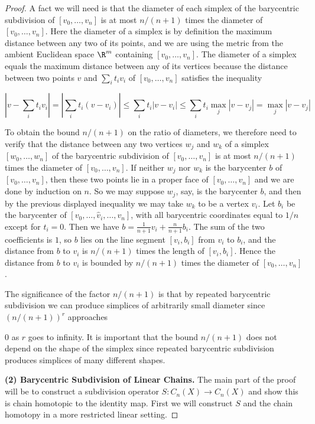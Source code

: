 \begin{proof}
A fact we will need is that the diameter of each simplex of the barycentric subdivision of $[v_0,\ldots,v_n]$ is at most $n/(n+1)$ times the diameter of $[v_0,\ldots,v_n]$. Here the diameter of a simplex is by definition the maximum distance between any two of its points, and we are using the metric from the ambient Euclidean space $\R^m$ containing $[v_0,\ldots,v_n]$. The diameter of a simplex equals the maximum distance between any of its vertices because the distance between two points $v$ and $\sum_i t_i v_i$ of $[v_0,\ldots,v_n]$ satisfies the inequality

\[
|v - \sum_i t_i v_i| = |\sum_i t_i(v - v_i)| \le \sum_i t_i|v - v_i| \le \sum_i t_i \max_j |v - v_j| = \max_j|v - v_j|
\]

To obtain the bound $n/(n+1)$ on the ratio of diameters, we therefore need to verify that the distance between any two vertices $w_j$ and $w_k$ of a simplex $[w_0,\ldots,w_n]$ of the barycentric subdivision of $[v_0,\ldots,v_n]$ is at most $n/(n+1)$ times the diameter of $[v_0,\ldots,v_n]$. If neither $w_j$ nor $w_k$ is the barycenter $b$ of $[v_0,\ldots,v_n]$, then these two points lie in a proper face of $[v_0,\ldots,v_n]$ and we are done by induction on $n$. So we may suppose $w_j$, say, is the barycenter $b$, and then by the previous displayed inequality we may take $w_k$ to be a vertex $v_i$. Let $b_i$ be the barycenter of $[v_0,\ldots,\hat{v}_i,\ldots,v_n]$, with all barycentric coordinates equal to $1/n$ except for $t_i = 0$. Then we have $b = \frac{1}{n+1}v_i + \frac{n}{n+1}b_i$. The sum of the two coefficients is $1$, so $b$ lies on the line segment $[v_i,b_i]$ from $v_i$ to $b_i$, and the distance from $b$ to $v_i$ is $n/(n+1)$ times the length of $[v_i,b_i]$. Hence the distance from $b$ to $v_i$ is bounded by $n/(n+1)$ times the diameter of $[v_0,\ldots,v_n]$.

The significance of the factor $n/(n+1)$ is that by repeated barycentric subdivision we can produce simplices of arbitrarily small diameter since $(n/(n+1))^r$ approaches

0 as $r$ goes to infinity. It is important that the bound $n/(n+1)$ does not depend on the shape of the simplex since repeated barycentric subdivision produces simplices of many different shapes.

\textbf{(2) Barycentric Subdivision of Linear Chains.} The main part of the proof will be to construct a subdivision operator $S:C_n(X)\to C_n(X)$ and show this is chain homotopic to the identity map. First we will construct $S$ and the chain homotopy in a more restricted linear setting.


\end{proof}
